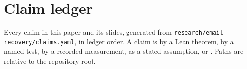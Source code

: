 \clearpage
\section{Claim ledger}\label{app:claims}

Every claim in this paper and its slides, generated from
\nolinkurl{research/email-recovery/claims.yaml}, in ledger order. A claim is
 by a Lean theorem,  by a named test,
 by a recorded measurement,  as a stated
assumption, or . Paths are relative to the repository
root.

{\footnotesize\ClaimList}
